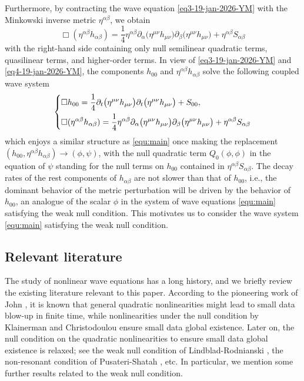 \documentclass[a4paper,reqno]{amsart}
\theoremstyle{definition}
\numberwithin{equation}{section}
\begin{document}
Furthermore, by contracting the wave equation \eqref{eq3-19-jan-2026-YM} with the Minkowski inverse metric $\eta^{\alpha\beta}$, we obtain
\begin{equation}\label{eq4-19-jan-2026-YM}
\Box(\eta^{\alpha\beta}h_{\alpha\beta}) = \frac{1}{4}\eta^{\alpha\beta}\partial_{\alpha}\big(\eta^{\mu\nu}h_{\mu\nu}\big)\partial_{\beta}\big(\eta^{\mu\nu}h_{\mu\nu}\big) + \eta^{\alpha\beta}S_{\alpha\beta}
\end{equation}
with the right-hand side containing only null semilinear quadratic terms, quasilinear terms, and higher-order terms.
In view of  \eqref{eq3-19-jan-2026-YM} and \eqref{eq4-19-jan-2026-YM}, the components $h_{00}$ and $\eta^{\alpha\beta}h_{\alpha\beta}$  solve the following coupled wave system
\begin{equation}
\label{eq:h00andtrh:semiwaveweaknull:vee}
\left\{
\aligned
&\Box h_{00} = \frac{1}{4}\partial_t\big(\eta^{\mu\nu}h_{\mu\nu}\big)\partial_t\big(\eta^{\mu\nu}h_{\mu\nu}\big) + S_{00},
\\
&\Box(\eta^{\alpha\beta}h_{\alpha\beta}) = \frac{1}{4}\eta^{\alpha\beta}\partial_{\alpha}\big(\eta^{\mu\nu}h_{\mu\nu}\big)\partial_{\beta}\big(\eta^{\mu\nu}h_{\mu\nu}\big) + \eta^{\alpha\beta}S_{\alpha\beta}
\endaligned
\right.
\end{equation}
which enjoys a similar structure as \eqref{equ:main} once making the replacement $(h_{00}, \eta^{\alpha\beta}h_{\alpha\beta})\to (\phi,\psi)$, with the null quadratic term $Q_0(\phi,\phi)$ in the equation of $\psi$ standing for the null terms on $h_{00}$ contained in 
$\eta^{\alpha\beta}S_{\alpha\beta}$. 
The decay rates of the rest components of $h_{\alpha\beta}$ are not slower than that of $h_{00}$, i.e., the dominant behavior of the metric perturbation will be driven by the behavior of $h_{00}$, an analogue of the scalar $\phi$ in the system of wave equations \eqref{equ:main} satisfying the weak null condition. This motivates us to consider the wave system \eqref{equ:main} satisfying the weak null condition.

\subsection{Relevant literature}
The study of nonlinear wave equations has a long history, and we briefly review the existing literature relevant to this paper.  According to the pioneering work of John \cite{John}, it is known that general quadratic nonlinearities might lead to small data blow-up in finite time, while nonlinearities under the null condition by Klainerman \cite{Klainerman86} and Christodoulou \cite{Christodoulou86} ensure small data global existence. Later on, the null condition on the quadratic nonlinearities to ensure small data global existence is relaxed; see the weak null condition of Lindblad-Rodnianski \cite{LindbladRodnianski2005,LindbladRodnianski2010}, the non-resonant condition of Pusateri-Shatah \cite{PusateriShatah2013}, etc. In particular, we mention some further results \cite{Alinhac2003, Lindblad2008, Katayama2015, DengPusateri2020, Keir18} related to the weak null condition.
\end{document}
